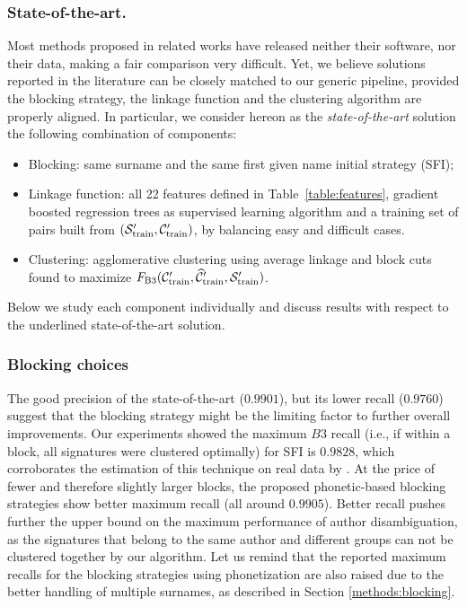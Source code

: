 \documentclass[runningheads,a4paper]{llncs}
\makeatletter
\newcommand*{\ie}{i.e.\@\xspace}
\makeatother
\begin{document}
\subsubsection{State-of-the-art.} Most methods proposed in related works have released
neither their software, nor their data, making a fair comparison very difficult.
Yet, we believe solutions reported in the literature can be closely
matched to our generic pipeline, provided the blocking strategy, the linkage
function and the clustering algorithm are properly aligned. In particular,
we consider hereon as the \textit{state-of-the-art} solution the following
combination of components:


\begin{itemize}
	\item Blocking: same surname and the same first given name initial strategy (SFI);
	\item Linkage function: all 22 features defined in Table~\ref{table:features},
	gradient boosted regression trees as supervised learning algorithm
	and a training set of pairs built from $({\cal S}_\text{train}^\prime, {\cal C}_\text{train}^\prime)$, by balancing easy and difficult cases.
	\item Clustering: agglomerative clustering using average linkage and
	block cuts found to maximize $F_\text{B3}({\cal C}_\text{train}^\prime, \widehat{\cal C}_\text{train}^\prime, {\cal S}_\text{train}^\prime)$.
\end{itemize}

Below we study each component individually and discuss
results with respect to the underlined state-of-the-art solution.

\subsubsection{Blocking choices}
\label{choices:blocking}


The good precision of the state-of-the-art ($0.9901$), but its
lower recall ($0.9760$) suggest that the blocking strategy might be the
limiting factor to further overall improvements.
Our experiments showed the maximum $B3$ recall (\ie, if within a block, all signatures were clustered optimally) for SFI is $0.9828$, which corroborates the
estimation of this technique on real data by \cite{torvik2009author}.
At the price of fewer and therefore slightly larger blocks, the
proposed phonetic-based blocking strategies show better maximum recall (all
around $0.9905$). Better recall pushes further the upper bound on the maximum
performance of author disambiguation, as the signatures that belong to the same author
and different groups can not be clustered together by our algorithm.
Let us remind that the reported maximum recalls for the blocking strategies using phonetization are
also raised due to the better handling of multiple surnames, as described in Section \ref{methods:blocking}.
\end{document}

